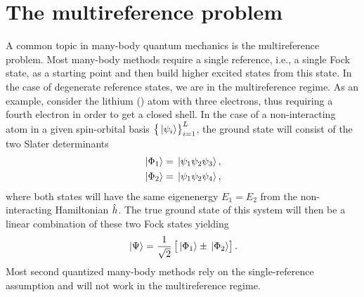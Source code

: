     \section{The multireference problem}
        A common topic in many-body quantum mechanics is the multireference
        problem.
        Most many-body methods require a single reference, i.e., a single Fock
        state, as a starting point and then build higher excited states from
        this state.
        In the case of degenerate reference states, we are in the multireference
        regime.
        As an example, consider the lithium () atom with three electrons, thus
        requiring a fourth electron in order to get a closed shell.
        In the case of a non-interacting  atom in a given spin-orbital
        basis $\left\{ \ket*{\psi_i} \right\}_{i = 1}^{L}$, the ground state will consist
        of the two Slater determinants
        \begin{align}
            \ket*{\Phi_1} &= \ket*{\psi_1\psi_2\psi_3}, \\
            \ket*{\Phi_2} &= \ket*{\psi_1\psi_2\psi_4},
        \end{align}
        where both states will have the same eigenenergy $E_1 = E_2$ from the
        non-interacting Hamiltonian $\hat{h}$.
        The true ground state of this system will then be a linear combination
        of these two Fock states yielding
        \begin{align}
            \ket*{\Psi}
            = \frac{1}{\sqrt{2}}\left[ 
                \ket*{\Phi_1}
                \pm
                \ket*{\Phi_2}
             \right].
        \end{align}
        Most second quantized many-body methods rely on the single-reference
        assumption and will not work in the multireference regime.

\clearemptydoublepage
